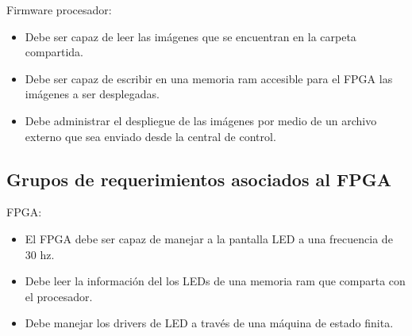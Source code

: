 Firmware procesador:
\begin{itemize}
\item Debe ser capaz de leer las imágenes que se encuentran en la carpeta compartida.
\item Debe ser capaz de escribir en una  memoria ram accesible para el FPGA  las imágenes a ser desplegadas.
\item Debe administrar el despliegue de las imágenes por medio de un archivo externo que sea enviado desde la central de control.
\end{itemize}
\subsection{Grupos de requerimientos asociados al FPGA}
FPGA:
\begin{itemize}
\item El FPGA debe ser capaz de manejar a la pantalla LED a una frecuencia de  30 hz.
\item Debe leer la información del los LEDs de una memoria ram que comparta con el procesador.
\item Debe manejar los drivers de LED a través de una máquina de estado finita.   
\end{itemize}